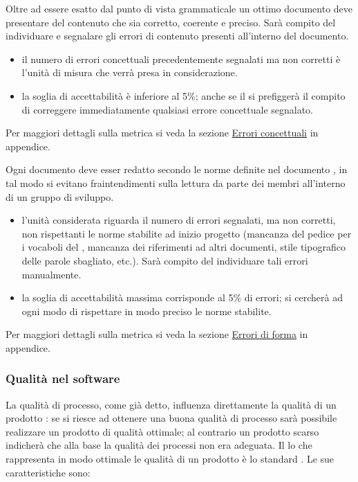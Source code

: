 \documentclass[a4paper, titlepage]{article}
\begin{document}
Oltre ad essere esatto dal punto di vista grammaticale un ottimo documento deve presentare del contenuto che sia corretto, coerente e preciso. Sarà compito del  individuare e segnalare gli errori di contenuto presenti all'interno del documento.
\begin{itemize}
\item {} il numero di errori concettuali precedentemente segnalati ma non corretti è l'unità di misura che verrà presa in considerazione.
\item {} la soglia di accettabilità è inferiore al 5\%; anche se il  si prefiggerà il compito di correggere immediatamente qualsiasi errore concettuale segnalato. 
\end{itemize}
Per maggiori dettagli sulla metrica si veda la sezione \hyperref[par:errcon]{Errori concettuali} in appendice.

Ogni documento deve esser redatto secondo le norme definite nel documento , in tal modo si evitano fraintendimenti sulla lettura da parte dei membri all'interno di un gruppo di sviluppo.
\begin{itemize}
\item {} l'unità considerata riguarda il numero di errori  segnalati, ma non corretti, non rispettanti le norme stabilite ad inizio progetto (mancanza del pedice per i vocaboli del , mancanza dei riferimenti ad altri documenti, stile tipografico delle parole sbagliato, etc.). Sarà compito del  individuare tali errori manualmente.
\item {} la soglia di accettabilità massima corrisponde al 5\% di errori; si cercherà ad ogni modo di rispettare in modo preciso le norme stabilite.
\end{itemize}
Per maggiori dettagli sulla metrica si veda la sezione \hyperref[par:errfor]{Errori di forma} in appendice.

\subsubsection{Qualità nel software}
La qualità di processo, come già detto, influenza direttamente la qualità di un prodotto : se si riesce ad ottenere una buona qualità di processo sarà possibile realizzare un prodotto di qualità ottimale; al contrario un prodotto scarso indicherà che alla base la qualità dei processi non era adeguata.
\newline Il lo che rappresenta in modo ottimale le qualità di un prodotto  è lo standard .
\newline Le sue caratteristiche sono:
\end{document}
